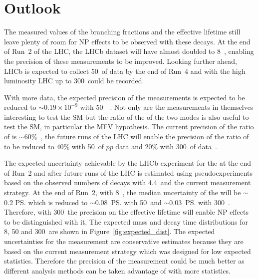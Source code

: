 \section{Outlook}
The measured values of the branching fractions and the effective lifetime still leave plenty of room for NP effects to be observed with these decays. At the end of Run~2 of the LHC, the LHCb dataset will have almost doubled to 8~\fb, enabling the precision of these measurements to be improved. Looking further ahead, LHCb is expected to collect 50~\fb of data by the end of Run~4 and with the high luminosity LHC up to 300~\fb could be recorded. 

With more data, the expected precision of the \BF measurements is expected to be reduced to $\sim 0.19 \times 10^{-9}$ with 50~\fb~\cite{LHCb-PUB-2014-040}. Not only are the \BF measurements in themselves interesting to test the SM but the ratio of the \BFs of the two modes is also useful to test the SM, in particular the MFV hypothesis. The current precision of the ratio of \BFs is $\sim 60\%$~\cite{CMS:2014xfa}, the future runs of the LHC will enable the precision of the ratio of \BFs to be reduced to 40$\%$ with 50~\fb of $pp$ data and 20$\%$ with 300~\fb of data~\cite{Aaij:2244311}. 

The expected uncertainty achievable by the LHCb experiment for the \el at the end of Run~2 and after future runs of the LHC is estimated using pseudoexperiments based on the observed numbers of decays with 4.4~\fb and the current measurement strategy. At the end of Run~2, with 8~\fb, the median uncertainty of the \el will be $\sim$0.2 \ps which is reduced to $\sim$0.08~\ps with 50~\fb and $\sim$0.03~\ps with 300~\fb. Therefore, with 300~\fb the precision on the effective lifetime will enable NP effects to be distinguished with it. The expected mass and decay time distributions for 8, 50 and 300~\fb are shown in Figure~\ref{fig:expected_dist}. The expected uncertainties for the \el measurement are conservative estimates because they are based on the current measurement strategy which was designed for low expected statistics. Therefore the precision of the measurement could be much better as different analysis methods can be taken advantage of with more statistics. 


